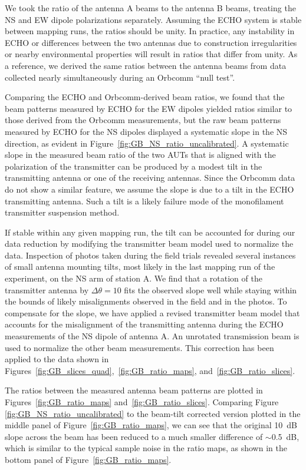 \documentclass[preprint2,numberedappendix,tighten,twocolappendix]{aastex6}
\begin{document}
We took the ratio of the antenna A beams to the antenna B beams, treating the NS and EW dipole polarizations separately.  Assuming the ECHO system is stable between mapping runs, the ratios should be unity.  In practice, any instability in ECHO or differences between the two antennas due to construction irregularities or nearby environmental properties will result in ratios that differ from unity.  As a reference, we derived the same ratios between the antenna beams from data collected nearly simultaneously during an Orbcomm ``null test''.   

Comparing the ECHO and Orbcomm-derived beam ratios, we found that the beam patterns measured by ECHO for the EW dipoles yielded ratios similar to those derived from the Orbcomm measurements, but the raw beam patterns measured by ECHO for the NS dipoles displayed a systematic slope in the NS direction, as evident in Figure~\ref{fig:GB_NS_ratio_uncalibrated}.  A systematic slope in the measured beam ratio of the two AUTs that is aligned with the polarization of the transmitter can be produced by a modest tilt in the transmitting antenna or one of the receiving antennas.  Since the Orbcomm data do not show a similar feature, we assume the slope is due to a tilt in the ECHO transmitting antenna.  Such a tilt is a likely failure mode of the monofilament transmitter suspension method.  

If stable within any given mapping run, the tilt can be accounted for during our data reduction by modifying the transmitter beam model used to normalize the data.  Inspection of photos taken during the field trials revealed several instances of small antenna mounting tilts, most likely in the last mapping run of the experiment, on the NS arm of station A.   We find that a rotation of the transmitter antenna by $\Delta \theta = 10$\arcdeg{} fits the observed slope well while staying within the bounds of likely misalignments observed in the field and in the photos.  To compensate for the slope, we have applied a revised transmitter beam model that accounts for the misalignment of the transmitting antenna during the ECHO measurements of the NS dipole of antenna A.  An unrotated transmission beam is used to normalize  the other beam measurements.  This correction has been applied to the data shown in Figures~\ref{fig:GB_slices_quad},~\ref{fig:GB_ratio_maps}, and~\ref{fig:GB_ratio_slices}.

The ratios between the measured antenna beam patterns are plotted in Figures~\ref{fig:GB_ratio_maps} and~\ref{fig:GB_ratio_slices}.   Comparing Figure \ref{fig:GB_NS_ratio_uncalibrated} to the beam-tilt corrected version plotted in the middle panel of Figure~\ref{fig:GB_ratio_maps}, we can see that the original 10~dB slope across the beam has been reduced to a much smaller difference of  $\sim$0.5~dB, which is similar to the typical sample noise in the ratio maps, as shown in the bottom panel of Figure~\ref{fig:GB_ratio_maps}.   
\end{document}
